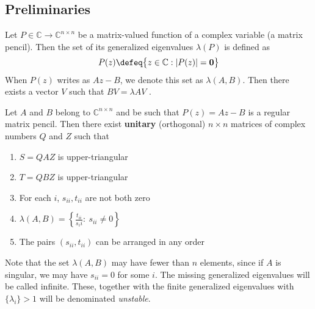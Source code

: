 \documentclass[a4paper,10pt]{article}  %
\begin{document}
\subsection{Preliminaries} %
\label{sub:preliminaries}

\begin{definition}
   Let $ P\in \mathbb{C}\rightarrow \mathbb{C}^{n\times n} $ be a matrix-valued function of a complex variable (a matrix
pencil). Then the set of its generalized eigenvalues $ \lambda( P) $ is defined as
\[
   P(z) \defeq \big\{ z\in \mathbb{C}: \lvert P(z) \rvert = \mathbf{0} \big\}
\]
When $P(z)$ writes as $Az-B$, we denote this set as $\lambda(A,B)$. Then there exists
a vector $V$ such that $BV = \lambda AV$ .
\end{definition}

\begin{theorem}
Let $A$ and $B$ belong to $ \mathbb{C}^{n\times n} $ and be such that $ P(z) = Az - B$ is a regular matrix pencil. Then
there exist \textbf{unitary} (orthogonal) $n\times n$ matrices of complex numbers $Q$ and $Z$ such that
\begin{enumerate}
   
   \item $ S = Q A Z $ is upper-triangular
   \item $ T = Q B Z $ is upper-triangular
   \item For each $ i $, $ s_{ii},t_{ii}$ are not both zero
   \item $ \lambda(A,B) = \left\{ \frac{t_{ii}}{s_ii} : \ s_{ii}\ne 0 \right\}$
   \item The pairs $ (s_{ii}, t_{ii} ) $ can be arranged in any order
\end{enumerate}
Note that the set $ \lambda(A,B) $ may have fewer than $ n $ elements, since if $ A $ is singular, we may have $
s_{ii}=0 $ for some $ i $. The missing generalized eigenvalues will be called infinite. These, together with the finite
generalized eigenvalues with $ \{\lambda_i \} >1$ will be denominated \emph{unstable}. 
\end{theorem}
\end{document}
